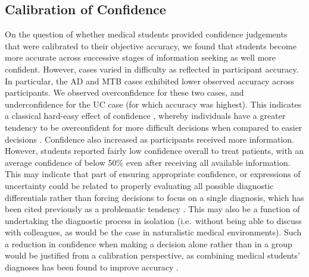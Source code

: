 \documentclass[a4paper, nobind]{templates/ociamthesis}
\begin{document}
\subsection{Calibration of Confidence}\label{calibration-of-confidence}

On the question of whether medical students provided confidence judgements that were calibrated to their objective accuracy, we found that students become more accurate across successive stages of information seeking as well more confident. However, cases varied in difficulty as reflected in participant accuracy. In particular, the AD and MTB cases exhibited lower observed accuracy across participants. We observed overconfidence for these two cases, and underconfidence for the UC case (for which accuracy was highest). This indicates a classical hard-easy effect of confidence \autocite{lichtenstein_calibration_1977}, whereby individuals have a greater tendency to be overconfident for more difficult decisions when compared to easier decisions \autocite{merkle_disutility_2009}. Confidence also increased as participants received more information. However, students reported fairly low confidence overall to treat patients, with an average confidence of below 50\% even after receiving all available information. This may indicate that part of ensuring appropriate confidence, or expressions of uncertainty could be related to properly evaluating all possible diagnostic differentials rather than forcing decisions to focus on a single diagnosis, which has been cited previously as a problematic tendency \autocite{redelmeier_fallacy_2023}. This may also be a function of undertaking the diagnostic process in isolation (i.e.~without being able to discuss with colleagues, as would be the case in naturalistic medical environments). Such a reduction in confidence when making a decision alone rather than in a group would be justified from a calibration perspective, as combining medical students' diagnoses has been found to improve accuracy \autocite{kammer_potential_2017}.\\
\end{document}
